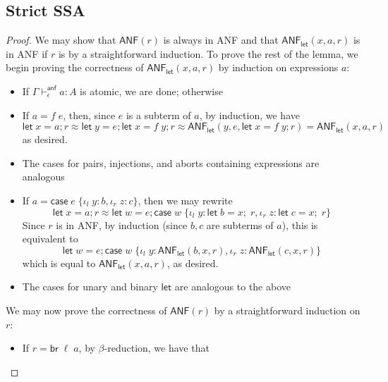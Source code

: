 \documentclass[acmsmall,screen,review]{acmart}
\newcommand{\ms}[1]{\ensuremath{\mathsf{#1}}}
\newcommand{\lto}{:}
\newcommand{\linl}[1]{\iota_l\;{#1}}
\newcommand{\linr}[1]{\iota_r\;{#1}}
\newcommand{\letexpr}[3]{\ensuremath{\ms{let}\;#1 = #2;\;#3}}
\newcommand{\caseexpr}[5]{\ms{case}\;#1\;\{\linl{#2} \lto #3, \linr{#4} \lto #5\}}
\newcommand{\letstmt}[3]{\ensuremath{\ms{let}\;#1 = #2; #3}}
\newcommand{\brb}[2]{\ms{br}\;#1\;#2}
\newcommand{\casestmt}[5]{\ms{case}\;#1\;\{\linl{#2} \lto #3, \linr{#4} \lto #5\}}
\newcommand{\ahasty}[4]{#1 \vdash_{#2}^{\ms{anf}} #3 : {#4}}
\newcommand{\teqv}{\approx}
\newcommand{\toanf}[1]{\ms{ANF}(#1)}
\newcommand{\letanf}[3]{\ms{ANF}_{\ms{let}}(#1, #2, #3)}
\begin{document}
\subsection{Strict SSA}

\anfconversion*

\label{proof:anf-conversion}

\ssaconversion*

\begin{proof}
  We may show that $\ms{ANF}(r)$ is always in ANF and that $\ms{ANF}_{\ms{let}}(x, a, r)$ is in ANF
  if $r$ is by a straightforward induction. To prove the rest of the lemma, we begin proving the
  correctness of $\ms{ANF}_{\ms{let}}(x, a, r)$ by induction on expressions $a$:
  \begin{itemize}
    \item If $\ahasty{\Gamma}{\epsilon}{a}{A}$ is atomic, we are done; otherwise
    \item If $a = f\;e$, then, since $e$ is a subterm of $a$, by induction, we have
    \begin{equation}
      \letstmt{x}{a}{r} 
      \teqv \letstmt{y}{e}{\letstmt{x}{f\;y}{r}}
      \teqv \letanf{y}{e}{\letstmt{x}{f\;y}{r}}
      = \letanf{x}{a}{r}
    \end{equation}
    as desired.
    \item The cases for pairs, injections, and aborts containing expressions are analogous
    \item If $a = \caseexpr{e}{y}{b}{z}{c}$, then we may rewrite
    \begin{equation}
      \letstmt{x}{a}{r} 
      \teqv \letstmt{w}{e}{\casestmt{w}{y}{\letexpr{b}{x}{r}}{z}{\letexpr{c}{x}{r}}}
    \end{equation}
    Since $r$ is in ANF, by induction (since $b, c$ are subterms of $a$), this is equivalent to
    \begin{equation}
      \letstmt{w}{e}
        {\casestmt{w}{y}{\letanf{b}{x}{r}}{z}{\letanf{c}{x}{r}}}
    \end{equation}
    which is equal to $\letanf{x}{a}{r}$, as desired.
    \item The cases for unary and binary $\ms{let}$ are analogous to the above
  \end{itemize}
  We may now prove the correctness of $\toanf{r}$ by a straightforward induction on $r$:
  \begin{itemize}
    \item If $r = \brb{\ell}{a}$, by $\beta$-reduction, we have that
    \begin{equation}

\end{equation}
\end{itemize}
\end{proof}
\end{document}
